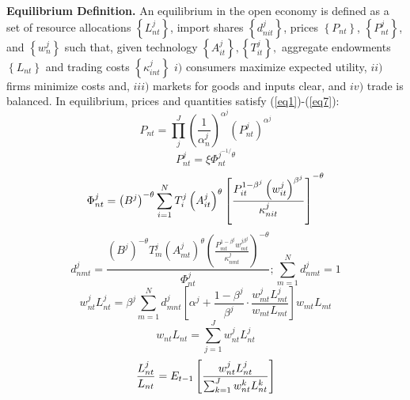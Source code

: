 \documentclass[12pt]{article}
\begin{document}
\textbf{Equilibrium Definition. } An equilibrium in the open economy is
defined as a set of resource allocations $\left\{ L_{nt}^{j}\right\} $,
import shares $\left\{ d_{nit}^{j}\right\} $, prices $\left\{ P_{nt}\right\} 
$, $\left\{ P_{nt}^{j}\right\} $, and $\left\{ w_{n}^{j}\right\} $ such
that, given technology $\left\{ A_{it}^{j}\right\}
,\left\{T_{it}^{j}\right\} ,$ aggregate endowments $\left\{ L_{nt}\right\} $
and trading costs $\left\{ \kappa _{int}^{j}\right\} $ $i)$ consumers
maximize expected utility, $ii)$ firms minimize costs and, $iii)$ markets
for goods and inputs clear, and $iv)$ trade is balanced. In equilibrium,
prices and quantities satisfy (\ref{eq1})-(\ref{eq7}): 
\begin{equation}
P_{nt}=\prod_{j}^{J}\left( \frac{1}{\alpha _{n}^{j}}\right)
^{\alpha^{j}}\left( P_{nt}^{j}\right) ^{\alpha ^{j}}  \label{eq1}
\end{equation}
\begin{equation}
P_{nt}^{j}=\xi\Phi _{nt}^{j^{-1/}\theta }  \label{eq2}
\end{equation}
\begin{equation}
\Phi _{nt}^{j}=\left( B^{j}\right) ^{-\theta
}\sum_{i=1}^{N}T_{i}^{j}\left(A_{it}^{j}\right) ^{\theta }\left[ \frac{%
P_{it}^{1-\beta ^{j}}\left(w_{it}^{j}\right) ^{\beta ^{j}}}{\kappa _{nit}^{j}%
}\right] ^{-\theta }  \label{eq3}
\end{equation}
\begin{equation}
d_{nmt}^{j}=\frac{\left( B^{j}\right) ^{-\theta
}T_{m}^{j}\left(A_{mt}^{j}\right) ^{\theta }\left( \frac{P_{mt}^{1-\beta
^{j}}w_{mt}^{j\beta^{j}}}{\kappa _{nmt}^{j}}\right) ^{-\theta }}{\Phi
_{nt}^{j}};\sum\limits_{m=1}^{N}d_{nmt}^{j}=1  \label{eq4}
\end{equation}
\begin{equation}
w_{nt}^{j}L_{nt}^{j}=\beta^{j}\sum_{m=1}^{N}d_{mnt}^{j}\left[\alpha^{j}+%
\frac{1-\beta^{j}}{\beta^j} \cdot \frac{w_{mt}^{j}L_{mt}^{j}}{w_{mt}L_{mt}}%
\right] w_{mt}L_{mt}  \label{eq5}
\end{equation}
\begin{equation}
w_{nt}L_{nt}=\sum_{j=1}^{J}w_{nt}^{j}L_{nt}^{j}  \label{eq6}
\end{equation}
\begin{equation}
\frac{L_{nt}^{j}}{L_{nt}}=E_{t-1}\left[ \frac{w_{nt}^{j}L_{nt}^{j}}{%
\sum_{k=1}^J w_{nt}^{k}L_{nt}^{k}}\right]  \label{eq7}
\end{equation}
\end{document}
